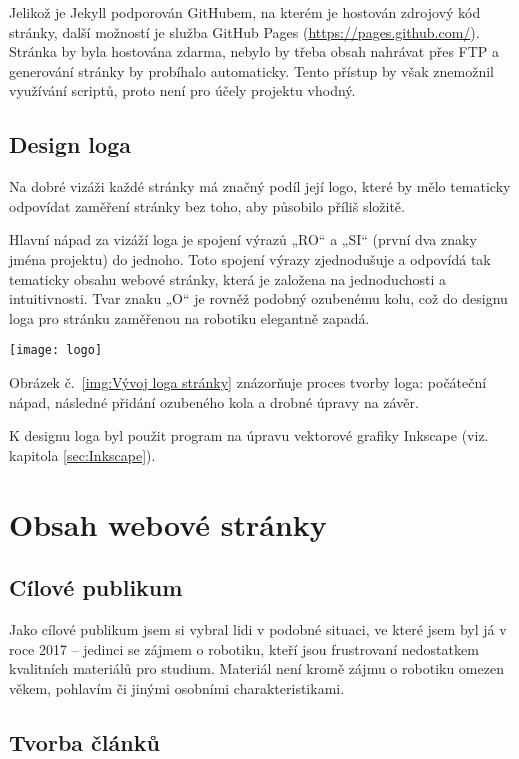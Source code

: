 \documentclass[a4paper, 12pt]{article}
\begin{document}
  Jelikož je Jekyll podporován GitHubem, na kterém je hostován zdrojový kód stránky, další možností je služba GitHub Pages (\url{https://pages.github.com/}). Stránka by byla hostována zdarma, nebylo by třeba obsah nahrávat přes FTP a generování stránky by probíhalo automaticky. Tento přístup by však znemožnil využívání scriptů, proto není pro účely projektu vhodný.


  \subsection{Design loga}
  Na dobré vizáži každé stránky má značný podíl její logo, které by mělo tematicky odpovídat zaměření stránky bez toho, aby působilo příliš složitě.

  Hlavní nápad za vizáží loga je spojení výrazů „RO“ a „SI“ (první dva znaky jména projektu) do jednoho. Toto spojení výrazy zjednodušuje a odpovídá tak tematicky obsahu webové stránky, která je založena na jednoduchosti a intuitivnosti. Tvar znaku „O“ je rovněž podobný ozubenému kolu, což do designu loga pro stránku zaměřenou na robotiku elegantně zapadá.

  \begin{center}
    \texttt{[image: logo]}
    \label{img:Vývoj loga stránky}
  \end{center}

  Obrázek č.~\ref{img:Vývoj loga stránky} znázorňuje proces tvorby loga: počáteční nápad, následné přidání ozubeného kola a drobné úpravy na závěr.

  K designu loga byl použit program na úpravu vektorové grafiky Inkscape (viz. kapitola \ref{sec:Inkscape}).


  \section{Obsah webové stránky}

  \subsection{Cílové publikum}
  Jako cílové publikum jsem si vybral lidi v podobné situaci, ve které jsem byl já v roce 2017 -- jedinci se zájmem o robotiku, kteří jsou frustrovaní nedostatkem kvalitních materiálů pro studium. Materiál není kromě zájmu o robotiku omezen věkem, pohlavím či jinými osobními charakteristikami.


  \subsection{Tvorba článků} \label{sec:Tvorba článků}
\end{document}
